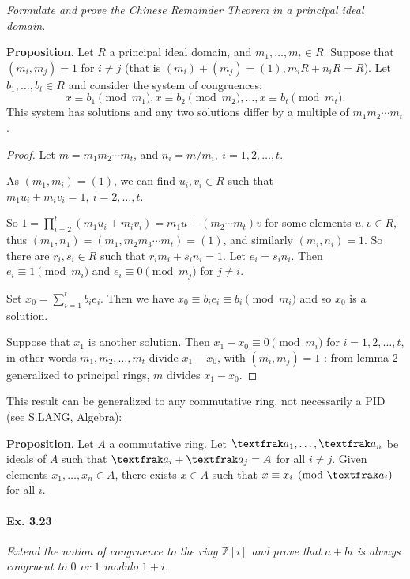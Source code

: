 \documentclass[11pt,a4paper]{article}
\newcommand{\Z}{\mathbb{Z}}
\begin{document}
{{\it Formulate and prove the Chinese Remainder Theorem in a principal ideal domain.
}

{\bf Proposition}. Let $R$ a principal ideal domain, and $m_1,\ldots,m_t \in R$. Suppose that $(m_i,m_j) = 1$ for $i\neq j$ (that is $(m_i) + (m_j) = (1), m_iR +n_i R = R$). Let $b_1,\ldots,b_t \in R$ and consider the system of congruences:
$$x \equiv b_1 \pmod {m_1}, x \equiv b_2 \pmod {m_2},\ldots, x \equiv b_t \pmod {m_t}.$$
This system has solutions and any two solutions differ by a multiple of $m_1m_2\cdots m_t$.
\begin{proof} 
Let $m = m_1m_2\cdots m_t$, and $n_i =m/m_i,\ i=1,2,\ldots,t$. 

As $(m_1,m_i)=(1)$, we can find $u_i,v_i \in R$ such that $m_1u_i+m_iv_i= 1, \ i=2,\ldots,t$.

So $1 = \prod\limits_{i=2}^t(m_1u_i+m_iv_i ) = m_1 u +(m_2\cdots m_t)v$ for some elements $u,v \in R$, thus $(m_1,n_1) = (m_1,m_2m_3\cdots m_t) = (1)$, and similarly $(m_i,n_i)=1$. So there are $r_i,s_i \in R$ such that $r_im_i+s_in_i = 1$. Let $e_i = s_in_i$. Then $e_i \equiv 1 \pmod{m_i}$ and $e_i \equiv 0 \pmod{m_j}$ for $j\neq i$.

Set $x_0 =\sum_{i=1}^t b_ie_i$. Then we have $x_0 \equiv b_i e_i \equiv b_i \pmod{m_i}$ and so $x_0$ is a solution.

Suppose that $x_1$ is another solution. Then $x_1 -x_0 \equiv 0 \pmod{m_i}$ for $i=1,2,\ldots,t$, in other words $m_1,m_2,\ldots,m_t$ divide $x_1-x_0$, with $(m_i,m_j)=1$ : from lemma 2 generalized to principal rings, $m$ divides $x_1-x_0$.
\end{proof}

\bigskip

This result can be generalized to any commutative ring, not necessarily a PID (see S.LANG, Algebra):

{\bf Proposition}. Let $A$ a commutative ring. Let ${\textfrak a}_1,\ldots, {\textfrak a}_n$ be ideals of $A$ such that ${\textfrak a}_i+{\textfrak a}_j = A$ for all $i\neq j$. Given elements $x_1,\ldots,x_n \in A$, there exists $x\in A$ such that $x\equiv x_i \pmod {{\textfrak a}_i}$ for all $i$.

\paragraph{Ex. 3.23}

{\it Extend the notion of congruence to the ring $\Z[i]$ and prove that $a + bi$ is always congruent to $0$ or $1$ modulo $1 + i$.
}

}
\end{document}
